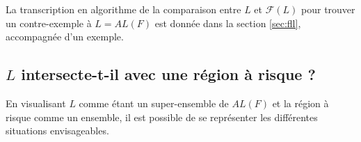 La transcription en algorithme de la comparaison entre $L$ et $\mathcal{F}(L)$ pour trouver un contre-exemple à $L=AL(F)$ est donnée dans la section \ref{sec:fll}, accompagnée d'un exemple.


\subsection{$L$ intersecte-t-il avec une région à risque ?}

En visualisant $L$ comme étant un super-ensemble de $AL(F)$ et la région à risque comme un ensemble, il est possible de se représenter les différentes situations envisageables.

\begin{figure}[H]


  \def\circleL{ (0,0) circle (1.5cm) node[right=0.8cm]  {$L$}}
  \def\circleAL{(-0.15,-0.3) circle (1cm) node {$AL(F)$}}


\end{figure}
